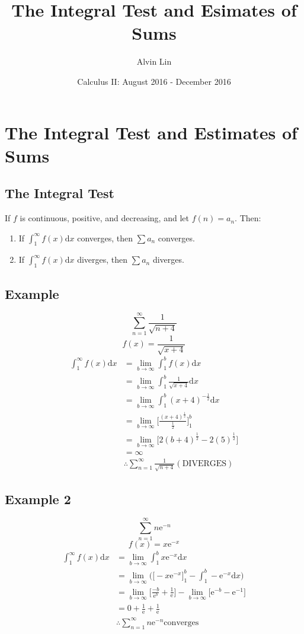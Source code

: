 \documentclass[letterpaper, 12pt]{article}
\title{The Integral Test and Esimates of Sums}
\author{Alvin Lin}
\date{Calculus II: August 2016 - December 2016}
\newcommand*{\diff}{\mathrm{d}}
\newcommand*{\e}{\mathrm{e}}
\begin{document}
\maketitle

\section*{The Integral Test and Estimates of Sums}

\subsection*{The Integral Test}
If \( f \) is continuous, positive, and decreasing, and let \( f(n) = a_{n} \).
Then:
\begin{enumerate}
  \item If \( \int_{1}^{\infty}f(x)\diff{x} \) converges, then
    \( \sum{a_{n}} \) converges.
  \item If \( \int_{1}^{\infty}f(x)\diff{x} \) diverges, then
    \( \sum{a_{n}} \) diverges.
\end{enumerate}

\subsection*{Example}
\[ \sum_{n=1}^{\infty}\frac{1}{\sqrt{n+4}} \]
\[ f(x) = \frac{1}{\sqrt{x+4}} \]
\begin{align*}
  \int_{1}^{\infty}f(x)\diff{x} &=
    \lim_{b\to\infty}\int_{1}^{b}f(x)\diff{x} \\
  &= \lim_{b\to\infty}\int_{1}^{b}\frac{1}{\sqrt{x+4}}\diff{x} \\
  &= \lim_{b\to\infty}\int_{1}^{b}(x+4)^{-\frac{1}{2}}\diff{x} \\
  &= \lim_{b\to\infty}\bigg[
    \frac{(x+4)^{\frac{1}{2}}}{\frac{1}{2}}\bigg]_{1}^{b} \\
  &= \lim_{b\to\infty}\bigg[2(b+4)^{\frac{1}{2}}-2(5)^{\frac{1}{2}}] \\
  &= \infty \\
  & \therefore \sum_{n=1}^{\infty}\frac{1}{\sqrt{n+4}}\mathrm{(DIVERGES)}
\end{align*}

\subsection*{Example 2}
\[ \sum_{n=1}^{\infty}n\e^{-n} \]
\[ f(x) = x\e^{-x} \]
\begin{align*}
  \int_{1}^{\infty}f(x)\diff{x} &=
    \lim_{b\to\infty}\int_{1}^{b}x\e^{-x}\diff{x} \\
  &= \lim_{b\to\infty}\bigg(\big[-x\e^{-x}\big]_{1}^{b}-
    \int_{1}^{b}-\e^{-x}\diff{x}\bigg) \\
  &= \lim_{b\to\infty}\bigg[\frac{-b}{\e^{b}}+\frac{1}{\e}\bigg]-
    \lim_{b\to\infty}\bigg[\e^{-b}-\e^{-1}\bigg] \\
  &= 0+\frac{1}{\e}+\frac{1}{\e} \\
  & \therefore \sum_{n=1}^{\infty}n\e^{-n} \mathrm{converges}
\end{align*}
\end{document}
